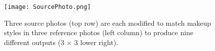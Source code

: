 \documentclass[10pt,twocolumn,letterpaper]{article}
\begin{document}
\begin{figure}[!htb]
\begin{center}
   \texttt{[image: SourcePhoto.png]}
\end{center}
   \caption{Three source photos (top row) are each modified to
match makeup styles in three reference photos (left column) to
produce nine different outputs (3 $\times$ 3 lower right).}
\label{fig:photos}
\end{figure}


{\small


}
\end{document}
